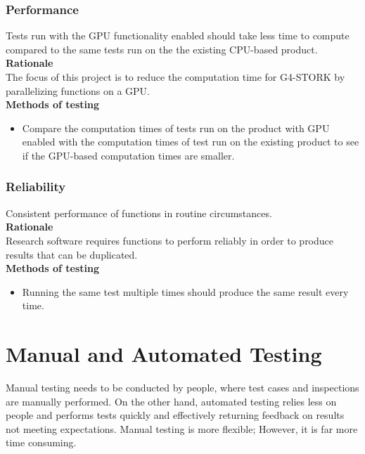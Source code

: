 \documentclass[12pt]{article}
\begin{document}
\subsubsection{Performance}
Tests run with the GPU functionality enabled should take less time to compute compared to the same tests run on the the existing CPU-based product.\\

\textbf{Rationale}\\
The focus of this project is to reduce the computation time for G4-STORK by parallelizing functions on a GPU.\\

\textbf{Methods of testing}
\begin{itemize}
\item Compare the computation times of tests run on the product with GPU enabled with the computation times of test run on the existing product to see if the GPU-based computation times are smaller.
\end{itemize}

\subsubsection{Reliability}
Consistent performance of functions in routine circumstances.\\

\textbf{Rationale}\\
Research software requires functions to perform reliably in order to produce results that can be duplicated.\\

\textbf{Methods of testing}
\begin{itemize}
\item Running the same test multiple times should produce the same result every time.
\end{itemize} 
\section{Manual and Automated Testing}
Manual testing needs to be conducted by people, where test cases and inspections are manually performed. On the other hand, automated testing relies less on people and performs tests quickly and effectively returning feedback on results not meeting expectations. Manual testing is more flexible; However, it is far more time consuming.\\
\end{document}
